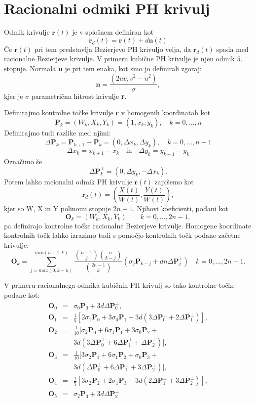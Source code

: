 \documentclass[12pt]{article}
\begin{document}
\section{Racionalni odmiki PH krivulj}
Odmik krivulje $\textbf{r}(t)$ je v splošnem definiran kot
$$\textbf{r}_d(t) = \textbf{r}(t) + d \textbf{n}(t)$$
Če $\textbf{r}(t)$ pri tem predstavlja Bezierjevo PH krivuljo velja, 
da $\textbf{r}_d(t)$ spada med racionalne Bezierjeve krivulje. V primeru kubične PH krivulje 
je njen odmik $5.$ stopnje. Normala \textbf{n} je pri tem enaka, kot smo jo definirali zgoraj:
$$\textbf{n} =\frac{(2uv, v^2 - u^2)}{\sigma},$$
kjer je $\sigma$ parametrična hitrost krivulje \textbf{r}.

Definirajmo kontrolne točke krivulje \textbf{r} v homogenih koordinatah kot
$$ \textbf{P}_k = (W_k, X_k, Y_k) = (1, x_k, y_k), \quad k = 0, ..., n$$
Definirajmo tudi razlike med njimi:
$$\Delta \textbf{P}_k = \textbf{P}_{k+1}-\textbf{P}_k = (0, \Delta x_k, \Delta y_k), \quad k = 0, ..., n-1$$ 
$$\Delta x_k = x_{k+1} - x_k \quad \text{in} \quad \Delta y_k = y_{k+1} - y_k$$
Označimo še $$ \Delta \textbf{P}_k^{\perp} = (0, \Delta y_k, - \Delta x_k).$$ 
Potem lahko racionalni odmik PH krivulje $\textbf{r}(t)$ zapišemo kot
$$ \textbf{r}_d(t) = \left(\frac{X(t)}{W(t)}, \frac{Y(t)}{W(t)}\right),$$
kjer so W, X in Y polinomi stopnje $2n -1$. Njihovi koeficienti, podani kot
$$ \textbf{O}_k = (W_k, X_k, Y_k) \quad  \quad k = 0, ..., 2n-1,$$
pa definirajo kontrolne točke racionalne Bezierjeve krivulje. 
Homogene koordinate kontrolnih točk lahko izrazimo tudi s pomočjo kontrolnih točk podane začetne krivulje:
$$ \textbf{O}_k = \sum_{j=max(0,k-n)}^{min(n-1,k)}{\frac{\binom{n-1}{j}\binom{n}{k-j}}{\binom{2n-1}{k}}(\sigma_j \textbf{P}_{k-j}+d n \Delta \textbf{P}^{\perp}_{j})} \quad k = 0, ..., 2n-1.$$

V primeru racionalnega odmika kubičnih PH krivulj so tako kontrolne točke podane kot:
\begin{eqnarray}
	\textbf{O}_0 &=& \sigma_0 \textbf{P}_0 + 3 d \Delta \textbf{P}_0^{\perp},\nonumber \\
	\textbf{O}_1 &=& \frac{1}{5} [2 \sigma_1 \textbf{P}_0 + 3\sigma_0 \textbf{P}_1 + 3 d (3 \Delta \textbf{P}_0^{\perp} + 2 \Delta \textbf{P}_1^{\perp})],\nonumber \\
	\textbf{O}_2 &=& \frac{1}{10} [\sigma_2 \textbf{P}_0 + 6\sigma_1 \textbf{P}_1 + 3\sigma_0 \textbf{P}_2 + \nonumber \\
		& & 3 d (3 \Delta \textbf{P}_0^{\perp} + 6 \Delta \textbf{P}_1^{\perp} + \Delta \textbf{P}_2^{\perp})],\nonumber \\
	\textbf{O}_3 &=& \frac{1}{10} [3\sigma_2 \textbf{P}_1 + 6\sigma_1 \textbf{P}_2 + \sigma_0 \textbf{P}_3 + \nonumber \\
		& & 3 d (\Delta \textbf{P}_0^{\perp} + 6 \Delta \textbf{P}_1^{\perp} + 3 \Delta \textbf{P}_2^{\perp})],\nonumber \\
	\textbf{O}_4 &=& \frac{1}{5} [3\sigma_2 \textbf{P}_2 + 2\sigma_1 \textbf{P}_3 + 3 d (2\Delta \textbf{P}_1^{\perp} + 3 \Delta \textbf{P}_2^{\perp})],\nonumber \\
	\textbf{O}_5 &=& \sigma_2 \textbf{P}_3 + 3 d \Delta \textbf{P}_2^{\perp}\nonumber
\end{eqnarray}
\end{document}
